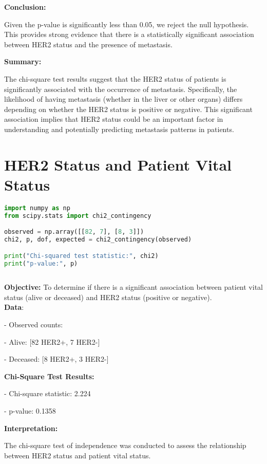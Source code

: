 \documentclass[12 px]{article}
\begin{document}
\textbf{Conclusion:}

Given the p-value is significantly less than 0.05, we reject the null hypothesis. This provides strong evidence that there is a statistically significant association between HER2 status and the presence of metastasis.
            
\textbf{Summary:}

The chi-square test results suggest that the HER2 status of patients is significantly
associated with the occurrence of metastasis. Specifically, the likelihood of having 
metastasis (whether in the liver or other organs) differs depending on whether the
HER2 status is positive or negative. This significant association implies that HER2 
status could be an important factor in understanding and potentially predicting metastasis patterns in patients.





\section*{HER2 Status and Patient Vital Status}
\begin{lstlisting}[language=Python, breaklines=true]
import numpy as np
from scipy.stats import chi2_contingency

observed = np.array([[82, 7], [8, 3]])
chi2, p, dof, expected = chi2_contingency(observed)

print("Chi-squared test statistic:", chi2)
print("p-value:", p)
        
\end{lstlisting}

\textbf{Objective:} To determine if there is a significant association between patient vital status (alive or deceased) and HER2 status (positive or negative).\\[5px]

\textbf{Data}:

- Observed counts:

   - Alive: [82 HER2+, 7 HER2-]
   
   - Deceased: [8 HER2+, 3 HER2-]

  

\textbf{Chi-Square Test Results:}

- Chi-square statistic: 2.224

- p-value: 0.1358


\textbf{Interpretation:}

The chi-square test of independence was conducted to assess the relationship between HER2 status and patient vital status.
\end{document}
